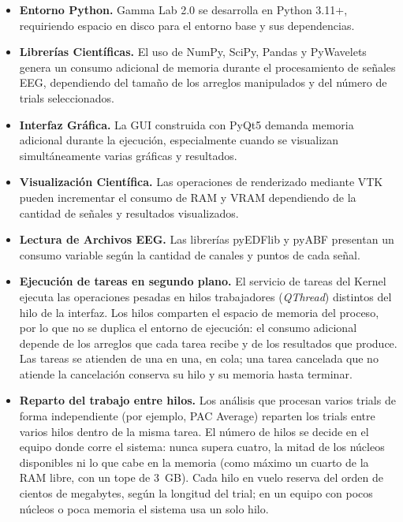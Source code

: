 \documentclass[12pt, letterpaper]{article}
\begin{document}
\begin{itemize}

    \item \textbf{Entorno Python.} Gamma Lab 2.0 se desarrolla en Python
    3.11+, requiriendo espacio en disco para el entorno base y sus
    dependencias.

    \item \textbf{Librerías Científicas.} El uso de NumPy, SciPy,
    Pandas y PyWavelets genera un consumo adicional de memoria
    durante el procesamiento de señales EEG, dependiendo del tamaño de los
    arreglos manipulados y del número de trials seleccionados.

    \item \textbf{Interfaz Gráfica.} La GUI construida con PyQt5 demanda
    memoria adicional durante la ejecución, especialmente cuando se
    visualizan simultáneamente varias gráficas y resultados.

    \item \textbf{Visualización Científica.} Las operaciones de renderizado
    mediante VTK pueden incrementar el consumo de RAM y VRAM dependiendo de
    la cantidad de señales y resultados visualizados.

    \item \textbf{Lectura de Archivos EEG.} Las librerías pyEDFlib y pyABF
    presentan un consumo variable según la cantidad de canales y puntos de
    cada señal.

    \item \textbf{Ejecución de tareas en segundo plano.} El servicio de tareas
    del Kernel ejecuta las operaciones pesadas en hilos trabajadores
    (\textit{QThread}) distintos del hilo de la interfaz. Los hilos comparten
    el espacio de memoria del proceso, por lo que no se duplica el entorno de
    ejecución: el consumo adicional depende de los arreglos que cada tarea
    recibe y de los resultados que produce. Las tareas se atienden de una en
    una, en cola; una tarea cancelada que no atiende la cancelación conserva
    su hilo y su memoria hasta terminar.

    \item \textbf{Reparto del trabajo entre hilos.} Los análisis que procesan
    varios trials de forma independiente (por ejemplo, PAC Average) reparten
    los trials entre varios hilos dentro de la misma tarea. El número de hilos
    se decide en el equipo donde corre el sistema: nunca supera cuatro, la
    mitad de los núcleos disponibles ni lo que cabe en la memoria (como máximo
    un cuarto de la RAM libre, con un tope de 3~GB). Cada hilo en vuelo reserva
    del orden de cientos de megabytes, según la longitud del trial; en un
    equipo con pocos núcleos o poca memoria el sistema usa un solo hilo.

\end{itemize}
\end{document}
